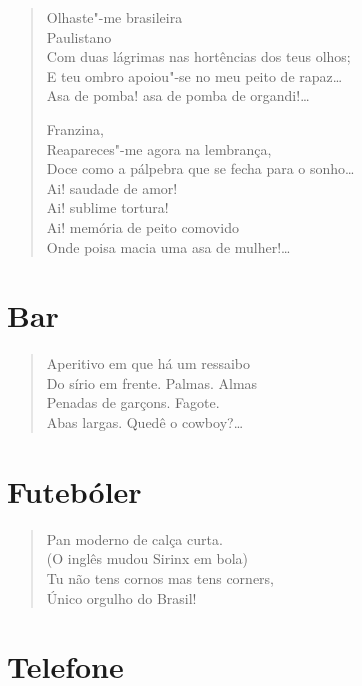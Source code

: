 \begin{verse}
Olhaste"-me brasileira\\
\quad\quad\quad\quad{}Paulistano\\
Com duas lágrimas nas hortências dos teus olhos;\\
E teu ombro apoiou"-se no meu peito de rapaz\ldots{}\\
Asa de pomba! asa de pomba de organdi!\ldots{}

Franzina,\\
Reapareces"-me agora na lembrança,\\
Doce como a pálpebra que se fecha para o sonho\ldots{}\\
Ai! saudade de amor!\\
Ai! sublime tortura!\\
Ai! memória de peito comovido\\
Onde poisa macia uma asa de mulher!\ldots{}
\end{verse}


\section*{Bar}

\begin{verse}
Aperitivo em que há um ressaibo\\
Do sírio em frente. Palmas. Almas\\
Penadas de garçons. Fagote.\\
Abas largas. Quedê o cowboy?\ldots{}
\end{verse}

\medskip
\section*{Futebóler}

\begin{verse}
Pan moderno de calça curta.\\
(O inglês mudou Sirinx em bola)\\
Tu não tens cornos mas tens corners,\\
Único orgulho do Brasil!
\end{verse}

\medskip
\section*{Telefone}

